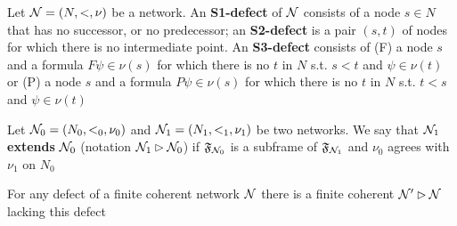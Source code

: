 \documentclass[11pt]{article}
\begin{document}
\begin{definition}[]
Let \(\mathcal{N}=(N,<,\nu)\) be a network. An \textbf{S1-defect} of \(\mathcal{N}\) consists of a
node \(s\in N\) that  has no successor, or no predecessor; an \textbf{S2-defect} is a
pair \((s,t)\) of nodes for which there is no intermediate point. An
\textbf{S3-defect} consists of (F) a node \(s\) and a formula \(F\psi\in\nu(s)\) for
which there is no \(t\) in \(N\) s.t. \(s<t\) and \(\psi\in\nu(t)\) or (P) a
node \(s\) and a formula \(P\psi\in\nu(s)\) for which there is no \(t\) in
\(N\) s.t. \(t<s\) and \(\psi\in\nu(t)\)
\end{definition}

\begin{definition}[]
Let \(\mathcal{N}_0=(N_0,<_0,\nu_0)\) and \(\mathcal{N}_1=(N_1,<_1,\nu_1)\) be two
networks. We say that \(\mathcal{N}_1\) \textbf{extends} \(\mathcal{N}_0\) (notation
\(\mathcal{N}_1\rhd\mathcal{N}_0\)) if \(\mathfrak{F}_{\mathcal{N}_0}\) is a subframe of
\(\mathfrak{F}_{\mathcal{N}_1}\) and \(\nu_0\) agrees with \(\nu_1\) on \(N_0\)
\end{definition}

\begin{lemma}
For any defect of a finite coherent network \(\mathcal{N}\) there is a finite
coherent \(\mathcal{N}'\rhd\mathcal{N}\) lacking this defect
\end{lemma}
\end{document}
